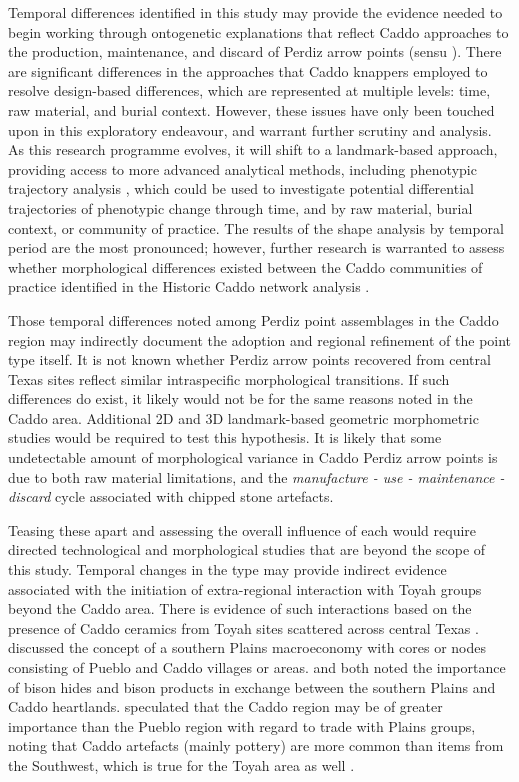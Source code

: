 \documentclass[review]{elsarticle}
\begin{document}
Temporal differences identified in this study may provide the evidence needed to begin working through ontogenetic explanations that reflect Caddo approaches to the production, maintenance, and discard of Perdiz arrow points (sensu \citealt{RN5871}). There are significant differences in the approaches that Caddo knappers employed to resolve design-based differences, which are represented at multiple levels: time, raw material, and burial context. However, these issues have only been touched upon in this exploratory endeavour, and warrant further scrutiny and analysis. As this research programme evolves, it will shift to a landmark-based approach, providing access to more advanced analytical methods, including phenotypic trajectory analysis \citep{RN8352,RN8561,RN8544,RN8560}, which could be used to investigate potential differential trajectories of phenotypic change through time, and by raw material, burial context, or community of practice. The results of the shape analysis by temporal period are the most pronounced; however, further research is warranted to assess whether morphological differences existed between the Caddo communities of practice identified in the Historic Caddo network analysis \citep{RN8031}.

Those temporal differences noted among Perdiz point assemblages in the Caddo region may indirectly document the adoption and regional refinement of the point type itself. It is not known whether Perdiz arrow points recovered from central Texas sites reflect similar intraspecific morphological transitions. If such differences do exist, it likely would not be for the same reasons noted in the Caddo area. Additional 2D and 3D landmark-based geometric morphometric studies would be required to test this hypothesis. It is likely that some undetectable amount of morphological variance in Caddo Perdiz arrow points is due to both raw material limitations, and the \textit{manufacture - use - maintenance - discard} cycle associated with chipped stone artefacts. 

Teasing these apart and assessing the overall influence of each would require directed technological and morphological studies that are beyond the scope of this study. Temporal changes in the type may provide indirect evidence associated with the initiation of extra-regional interaction with Toyah groups beyond the Caddo area. There is evidence of such interactions based on the presence of Caddo ceramics from Toyah sites scattered across central Texas \citep{RN9001}. \citet{RN6910} discussed the concept of a southern Plains macroeconomy with cores or nodes consisting of Pueblo and Caddo villages or areas. \citet{RN6046} and \citet{RN6910} both noted the importance of bison hides and bison products in exchange between the southern Plains and Caddo heartlands. \citet{RN6910} speculated that the Caddo region may be of greater importance than the Pueblo region with regard to trade with Plains groups, noting that Caddo artefacts (mainly pottery) are more common than items from the Southwest, which is true for the Toyah area as well \citep{RN8999}.
\end{document}
